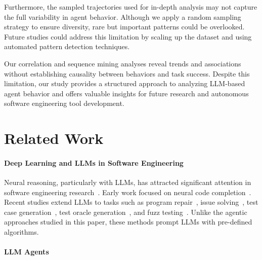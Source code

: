 \documentclass[conference,10pt]{IEEEtran}
\theoremstyle{definition}        %
\begin{document}
Furthermore, the sampled trajectories used for in-depth analysis may not capture the full variability in agent behavior. Although we apply a random sampling strategy to ensure diversity, rare but important patterns could be overlooked. Future studies could address this limitation by scaling up the dataset and using automated pattern detection techniques.  


Our correlation and sequence mining analyses reveal trends and associations without establishing causality between behaviors and task success. Despite this limitation, our study provides a structured approach to analyzing LLM-based agent behavior and offers valuable insights for future research and autonomous software engineering tool development.


 

\section{Related Work}

\paragraph{Deep Learning and LLMs in Software Engineering}

Neural reasoning, particularly with LLMs, has attracted significant attention in software engineering research~\cite{NeuralSoftwareAnalysis}.
Early work focused on neural code completion~\cite{Chen2021,ziegler2022productivity,arXiv2024_De-Hallucinator,Barke2023}.
Recent studies extend LLMs to tasks such as program repair~\cite{Jiang2023,Xia2024a,hidvegi2024cigar}, issue solving~\cite{Xia2024}, test case generation~\cite{Lemieux2023,Ryan2024,Yuan2024}, test oracle generation~\cite{Hayet2024a,Hossain2025}, and fuzz testing~\cite{icse2024-Fuzz4All}.
Unlike the agentic approaches studied in this paper, these methods prompt LLMs with pre-defined algorithms.

\paragraph{LLM Agents}
\end{document}
